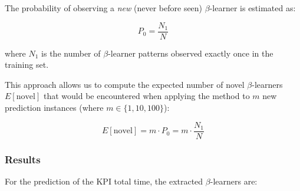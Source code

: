 \documentclass[manuscript,screen,review]{acmart}
\begin{document}
The probability of observing a \emph{new} (never before seen) $\beta$-learner is estimated as:

\begin{equation}
P_0 = \frac{N_1}{N}
\label{eq:good_turing_unseen}
\end{equation}

where $N_1$ is the number of $\beta$-learner patterns observed exactly once in the training set.

This approach allows us to compute the expected number of novel $\beta$-learners $E[\text{novel}]$ that would be encountered when applying the method to $m$ new prediction instances (where $m \in \{1, 10, 100\}$):

\begin{equation}
E[\text{novel}] = m \cdot P_0 = m \cdot \frac{N_1}{N}
\label{eq:expected_novel}
\end{equation}

\subsubsection{Results}


For the prediction of the KPI total time, the extracted $\beta$-learners are:
\end{document}
